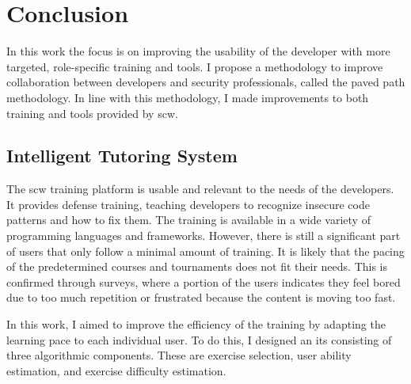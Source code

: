 \chapter{Conclusion}
\glsresetall

In this work the focus is on improving the usability of the developer with more targeted, role-specific training and tools.
I propose a methodology to improve collaboration between developers and security professionals, called the paved path methodology.
In line with this methodology, I made improvements to both training and tools provided by \gls{scw}.


\section{Intelligent Tutoring System}
The \gls{scw} training platform is usable and relevant to the needs of the developers.
It provides defense training, teaching developers to recognize insecure code patterns and how to fix them.
The training is available in a wide variety of programming languages and frameworks.
However, there is still a significant part of users that only follow a minimal amount of training.
It is likely that the pacing of the predetermined courses and tournaments does not fit their needs.
This is confirmed through surveys, where a portion of the users indicates they feel bored due to too much repetition or frustrated because the content is moving too fast.

In this work, I aimed to improve the efficiency of the training by adapting the learning pace to each individual user.
To do this, I designed an \gls{its} consisting of three algorithmic components.
These are exercise selection, user ability estimation, and exercise difficulty estimation.

